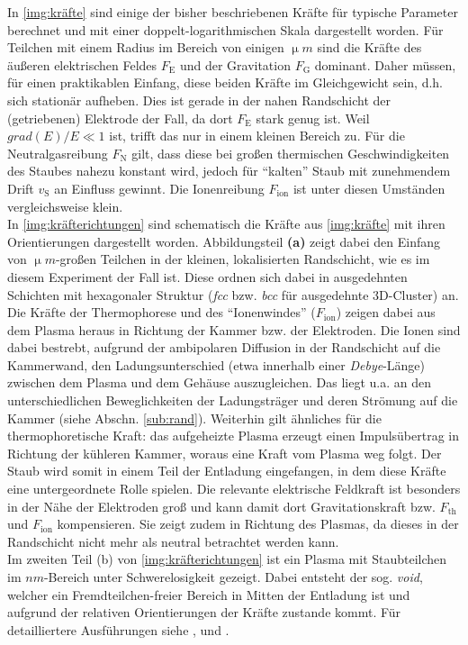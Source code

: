 \documentclass[numbers=noenddot,a4paper,notitlepage,twoside,BCOR15mm]{scrbook}
\newcommand{\ix}[1]{_\text{#1}}
\newcommand{\tilt}[1]{\textit{#1}}
\newcommand{\grad}[1]{\textit{grad}\left(#1\right)}
\newcommand{\fett}[1]{\textbf{#1}}
\begin{document}
			In \ref{img:kräfte} sind einige der bisher beschriebenen Kräfte für typische Parameter berechnet und mit einer doppelt-logarithmischen Skala dargestellt worden. Für Teilchen mit einem Radius im Bereich von einigen $\unit{\upmu m}$ sind die Kräfte des äußeren elektrischen Feldes $F\ix{E}$ und der Gravitation $F\ix{G}$ dominant. Daher müssen, für einen praktikablen Einfang, diese beiden Kräfte im Gleichgewicht sein, d.h. sich stationär aufheben. Dies ist gerade in der nahen Randschicht der (getriebenen) Elektrode der Fall, da dort $F\ix{E}$ stark genug ist. Weil $\grad{E}/E\ll1$ ist, trifft das nur in einem kleinen Bereich zu. Für die Neutralgasreibung $F\ix{N}$ gilt, dass diese bei großen thermischen Geschwindigkeiten des Staubes nahezu konstant wird, jedoch für "`kalten"' Staub mit zunehmendem Drift $v\ix{S}$ an Einfluss gewinnt. Die Ionenreibung $F\ix{ion}$ ist unter diesen Umständen vergleichsweise klein.\\
			In \ref{img:kräfterichtungen} sind schematisch die Kräfte aus \ref{img:kräfte} mit ihren Orientierungen dargestellt worden. Abbildungsteil \fett{(a)} zeigt dabei den Einfang von $\unit{\upmu m}$-großen Teilchen in der kleinen, lokalisierten Randschicht, wie es im diesem Experiment der Fall ist. Diese ordnen sich dabei in ausgedehnten Schichten mit hexagonaler Struktur (\tilt{fcc} bzw. \tilt{bcc} für ausgedehnte 3D-Cluster) an. Die Kräfte der Thermophorese und des "`Ionenwindes"' ($F\ix{ion}$) zeigen dabei aus dem Plasma heraus in Richtung der Kammer bzw. der Elektroden. Die Ionen sind dabei bestrebt, aufgrund der ambipolaren Diffusion in der Randschicht auf die Kammerwand, den Ladungsunterschied (etwa innerhalb einer \tilt{Debye}-Länge) zwischen dem Plasma und dem Gehäuse auszugleichen. Das liegt u.a. an den unterschiedlichen Beweglichkeiten der Ladungsträger und deren Strömung auf die Kammer (siehe Abschn. \ref{sub:rand}). Weiterhin gilt ähnliches für die thermophoretische Kraft: das aufgeheizte Plasma erzeugt einen Impulsübertrag in Richtung der kühleren Kammer, woraus eine Kraft vom Plasma weg folgt. Der Staub wird somit in einem Teil der Entladung eingefangen, in dem diese Kräfte eine untergeordnete Rolle spielen. Die relevante elektrische Feldkraft ist besonders in der Nähe der Elektroden groß und kann damit dort Gravitationskraft bzw. $F\ix{th}$ und $F\ix{ion}$ kompensieren. Sie zeigt zudem in Richtung des Plasmas, da dieses in der Randschicht nicht mehr als neutral betrachtet werden kann.\\
			Im zweiten Teil (b) von \ref{img:kräfterichtungen} ist ein Plasma mit Staubteilchen im $\unit{nm}$-Bereich unter Schwerelosigkeit gezeigt. Dabei entsteht der sog. \tilt{void}, welcher ein Fremdteilchen-freier Bereich in Mitten der Entladung ist und aufgrund der relativen Orientierungen der Kräfte zustande kommt. Für detailliertere Ausführungen siehe \cite{Dorier95}, \cite{Morfill99} und \cite{Goree99a}.
\end{document}
